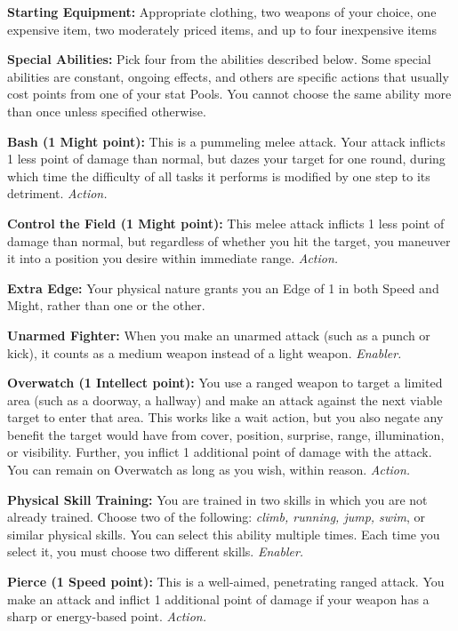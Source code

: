 \documentclass[a4paper,10pt,final,twocolumn,oneside]{book}
\newcommand{\itemLine}[2]{\textbf{#1:}{ #2}\par}
\newcommand{\itemAbility}[2]{\textcolor{25gray}{\textbullet\textbf{ #1:}}{ #2}\par}
\newcommand{\enabler}{\textit{ Enabler.}}
\newcommand{\action}{\textit{ Action.}}
\begin{document}
\itemLine{Starting Equipment}{Appropriate clothing, two weapons of your choice, one expensive item, two moderately priced items, and up to four inexpensive items}

\itemLine{Special Abilities}{Pick four from the abilities described below. Some special abilities are constant, ongoing effects, and others are specific actions that usually cost points from one of your stat Pools. You cannot choose the same ability more than once unless specified otherwise.}

\itemAbility{Bash (1 Might point)}{This is a pummeling melee attack. Your attack inflicts 1 less point of damage than normal, but dazes your target for one round, during which time the difficulty of all tasks it performs is modified by one step to its detriment.\action}

\itemAbility{Control the Field (1 Might point)}{This melee attack inflicts 1 less point of damage than normal, but regardless of whether you hit the target, you maneuver it into a position you desire within immediate range.\action}

\itemAbility{Extra Edge}{Your physical nature grants you an Edge of 1 in both Speed and Might, rather than one or the other.}

\itemAbility{Unarmed Fighter}{When you make an unarmed attack (such as a punch or kick), it counts as a medium weapon instead of a light weapon.\enabler}

\itemAbility{Overwatch (1 Intellect point)}{You use a ranged weapon to target a limited area (such as a doorway, a hallway) and make an attack against the next viable target to enter that area. This works like a wait action, but you also negate any benefit the target would have from cover, position, surprise, range, illumination, or visibility. Further, you inflict 1 additional point of damage with the attack. You can remain on Overwatch as long as you wish, within reason.\action}

\itemAbility{Physical Skill Training}{You are trained in two skills in which you are not already trained. Choose two of the following: \textit{climb, running, jump, swim}, or similar physical skills. You can select this ability multiple times. Each time you select it, you must choose two different skills.\enabler}

\itemAbility{Pierce (1 Speed point)}{This is a well-aimed, penetrating ranged attack. You make an attack and inflict 1 additional point of damage if your weapon has a sharp or energy-based point.\action}
\end{document}
